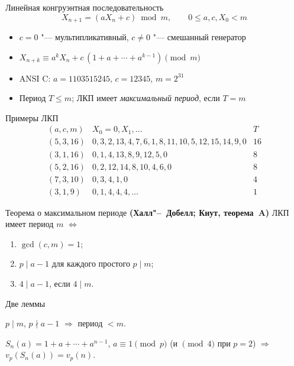 \documentclass{ca-slides}
\begin{document}
\begin{canvasframe}{Линейная конгруэнтная последовательность}
  \[X_{n+1} = (a X_n + c) \bmod m,\qquad 0 \le a, c, X_0 < m\]
  \begin{itemize}
    \item $c = 0$ "--- мультипликативный, $c \ne 0$ "--- смешанный генератор
    \item $X_{n+k} \equiv a^k X_n + c\,(1 + a + \cdots + a^{k-1}) \pmod m$
    \item ANSI C: $a = 1103515245$, $c = 12345$, $m = 2^{31}$
    \item Период $T \le m$; ЛКП имеет \emph{максимальный период}, если $T = m$
  \end{itemize}
\end{canvasframe}

\begin{canvasframe}{Примеры ЛКП}
  \[
  \begin{array}{l|l|c}
    (a, c, m) & X_0 = 0, X_1, \dots & T\\ \hline
    (5, 3, 16) & 0, 3, 2, 13, 4, 7, 6, 1, 8, 11, 10, 5, 12, 15, 14, 9, 0 & 16\\
    (3, 1, 16) & 0, 1, 4, 13, 8, 9, 12, 5, 0 & 8\\
    (5, 2, 16) & 0, 2, 12, 14, 8, 10, 4, 6, 0 & 8\\
    (7, 3, 10) & 0, 3, 4, 1, 0 & 4\\
    (3, 1, 9) & 0, 1, 4, 4, 4, \dots & 1
  \end{array}
  \]
\end{canvasframe}

\begin{theoremframe}{Теорема о максимальном периоде}
  \textbf{(Халл"--~Добелл; Кнут, теорема~A)}
  ЛКП имеет период $m$ $\iff$
  \begin{enumerate}
    \item $\gcd(c, m) = 1$;
    \item $p \mid a - 1$ для каждого простого $p \mid m$;
    \item $4 \mid a - 1$, если $4 \mid m$.
  \end{enumerate}
\end{theoremframe}

\begin{canvasframe}{Две леммы}
  \begin{lemma}
    $p \mid m$, $p \nmid a - 1$ $\Rightarrow$ период $< m$.
  \end{lemma}
  \begin{lemma}
    $S_n(a) = 1 + a + \cdots + a^{n-1}$, $a \equiv 1 \pmod p$ (и $\pmod 4$ при $p = 2$)
    $\Rightarrow$ $v_p(S_n(a)) = v_p(n)$.
  \end{lemma}
\end{canvasframe}
\end{document}

